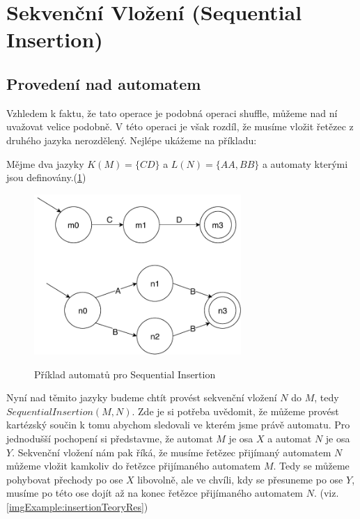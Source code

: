 \section{Sekvenční Vložení (Sequential Insertion)}
\subsection{Provedení nad automatem}
Vzhledem k faktu, že tato operace je podobná operaci shuffle, můžeme nad ní uvažovat velice podobně. V této operaci je však rozdíl, že musíme vložit řetězec z druhého jazyka nerozdělený. Nejlépe ukážeme na příkladu: 

Mějme dva jazyky $K(M)=\{CD\}$ a $L(N)=\{AA, BB\}$ a automaty kterými jsou definovány.(\ref{imgExample:insertionTeory})
\begin{figure}[H]
\centering
\includegraphics[width=0.7\textwidth]{obrazky-figures/IsertionPriklad.pdf}
\label{imgExample:insertionTeory}
\caption{Příklad automatů pro Sequential Insertion}
\end{figure}

Nyní nad těmito jazyky budeme chtít provést sekvenční vložení $N$ do $M$, tedy \\
$SequentialInsertion(M,N)$. Zde je si potřeba uvědomit, že můžeme provést kartézský součin k tomu abychom sledovali ve kterém jsme právě automatu. Pro jednodušší pochopení si
představme, že automat $M$ je osa $X$ a automat $N$ je osa $Y$. Sekvenční vložení nám pak říká, že musíme řetězec přijímaný automatem $N$ můžeme vložit kamkoliv do řetězce přijímaného automatem $M$. Tedy se můžeme pohybovat přechody po ose $X$
libovolně, ale ve chvíli, kdy se přesuneme po ose $Y$, musíme po této ose dojít až na konec řetězce přijímaného automatem $N$. (viz. \ref{imgExample:insertionTeoryRes})

